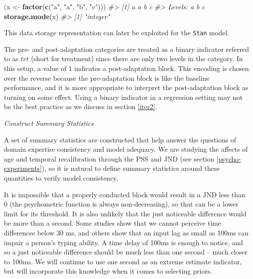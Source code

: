 \documentclass[11pt, oneside, openany]{scrbook}
\newenvironment{Shaded}{\begin{snugshade}}{\end{snugshade}}
\newcommand{\CommentTok}[1]{\textcolor[rgb]{0.56,0.35,0.01}{\textit{#1}}}
\newcommand{\KeywordTok}[1]{\textcolor[rgb]{0.13,0.29,0.53}{\textbf{#1}}}
\newcommand{\NormalTok}[1]{#1}
\newcommand{\StringTok}[1]{\textcolor[rgb]{0.31,0.60,0.02}{#1}}
\begin{document}

\begin{Shaded}
\begin{Highlighting}[]
\NormalTok{(x <-}\StringTok{ }\KeywordTok{factor}\NormalTok{(}\KeywordTok{c}\NormalTok{(}\StringTok{"a"}\NormalTok{, }\StringTok{"a"}\NormalTok{, }\StringTok{"b"}\NormalTok{, }\StringTok{"c"}\NormalTok{)))}
\CommentTok{#> [1] a a b c}
\CommentTok{#> Levels: a b c}
\KeywordTok{storage.mode}\NormalTok{(x)}
\CommentTok{#> [1] "integer"}
\end{Highlighting}
\end{Shaded}


This data storage representation can later be exploited for the \texttt{Stan} model.

The pre- and post-adaptation categories are treated as a binary indicator referred to as \(trt\) (short for treatment) since there are only two levels in the category. In this setup, a value of \(1\) indicates a post-adaptation block. This encoding is chosen over the reverse because the pre-adaptation block is like the baseline performance, and it is more appropriate to interpret the post-adaptation block as turning on some effect. Using a binary indicator in a regression setting may not be the best practice as we discuss in section \ref{iter2}.

\emph{Construct Summary Statistics}

A set of summary statistics are constructed that help answer the questions of domain expertise consistency and model adequacy. We are studying the affects of age and temporal recalibration through the PSS and JND (see section \ref{psycho-experiments}), so it is natural to define summary statistics around these quantities to verify model consistency.

It is impossible that a properly conducted block would result in a JND less than 0 (the psychometric function is always non-decreasing), so that can be a lower limit for its threshold. It is also unlikely that the just noticeable difference would be more than a second. Some studies show that we cannot perceive time differences below 30 ms, and others show that an input lag as small as 100ms can impair a person's typing ability. A time delay of 100ms is enough to notice, and so a just noticeable difference should be much less than one second -- much closer to 100ms. We will continue to use one second as an extreme estimate indicator, but will incorporate this knowledge when it comes to selecting priors.
\end{document}
